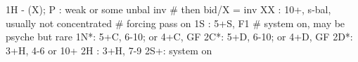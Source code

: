 1H - (X);
P  : weak or some unbal inv  # then bid/X = inv
XX : 10+, s-bal, usually not concentrated  # forcing pass on
1S : 5+S, F1  # system on, may be psyche but rare
1N*: 5+C, 6-10; or 4+C, GF
2C*: 5+D, 6-10; or 4+D, GF
2D*: 3+H, 4-6 or 10+
2H : 3+H, 7-9
2S+: system on